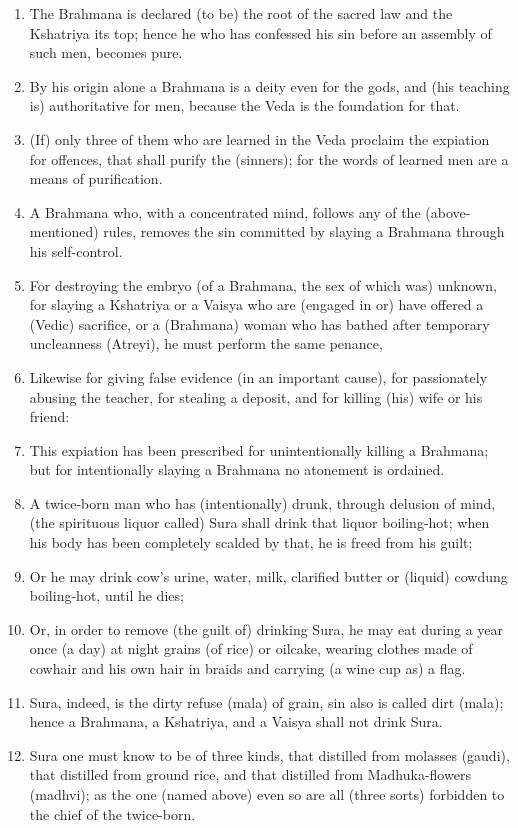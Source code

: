 \begin{enumerate}
\item The Brahmana is declared (to be) the root of the sacred law and the Kshatriya its top; hence he who has confessed his sin before an assembly of such men, becomes pure.
\item By his origin alone a Brahmana is a deity even for the gods, and (his teaching is) authoritative for men, because the Veda is the foundation for that.
\item (If) only three of them who are learned in the Veda proclaim the expiation for offences, that shall purify the (sinners); for the words of learned men are a means of purification.
\item A Brahmana who, with a concentrated mind, follows any of the (above-mentioned) rules, removes the sin committed by slaying a Brahmana through his self-control.
\item For destroying the embryo (of a Brahmana, the sex of which was) unknown, for slaying a Kshatriya or a Vaisya who are (engaged in or) have offered a (Vedic) sacrifice, or a (Brahmana) woman who has bathed after temporary uncleanness (Atreyi), he must perform the same penance,
\item Likewise for giving false evidence (in an important cause), for passionately abusing the teacher, for stealing a deposit, and for killing (his) wife or his friend:
\item This expiation has been prescribed for unintentionally killing a Brahmana; but for intentionally slaying a Brahmana no atonement is ordained.
\item A twice-born man who has (intentionally) drunk, through delusion of mind, (the spirituous liquor called) Sura shall drink that liquor boiling-hot; when his body has been completely scalded by that, he is freed from his guilt;
\item Or he may drink cow's urine, water, milk, clarified butter or (liquid) cowdung boiling-hot, until he dies;
\item Or, in order to remove (the guilt of) drinking Sura, he may eat during a year once (a day) at night grains (of rice) or oilcake, wearing clothes made of cowhair and his own hair in braids and carrying (a wine cup as) a flag.
\item Sura, indeed, is the dirty refuse (mala) of grain, sin also is called dirt (mala); hence a Brahmana, a Kshatriya, and a Vaisya shall not drink Sura.
\item Sura one must know to be of three kinds, that distilled from molasses (gaudi), that distilled from ground rice, and that distilled from Madhuka-flowers (madhvi); as the one (named above) even so are all (three sorts) forbidden to the chief of the twice-born.

\end{enumerate}
